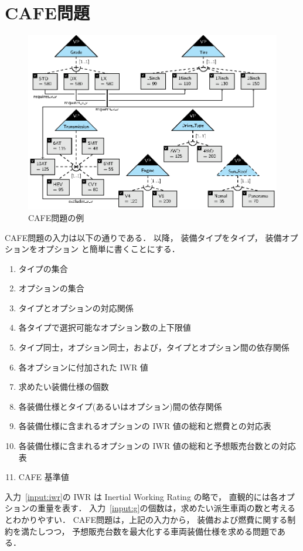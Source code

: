 \section{CAFE問題}\label{sec:background}

\begin{figure}[t]
  \centering
  \includegraphics[width=0.8\linewidth]{images/ovm_example.eps}
  \caption{CAFE問題の例}
  \label{fig:ovm_example}
\end{figure}

CAFE問題の入力は以下の通りである．
以降，
装備タイプをタイプ，
装備オプションをオプション
と簡単に書くことにする．
\begin{enumerate}
\item タイプの集合\label{input:vp}
\item オプションの集合\label{input:v}
\item タイプとオプションの対応関係\label{input:vp-v}
\item 各タイプで選択可能なオプション数の上下限値\label{input:ublb}
\item タイプ同士，オプション同士，および，タイプとオプション間の依存関係
  \label{input:dependency}
\item 各オプションに付加された IWR 値\label{input:iwr}
\item 求めたい装備仕様の個数\label{input:g}
\item 各装備仕様とタイプ(あるいはオプション)間の依存関係\label{input:init}
\item 各装備仕様に含まれるオプションの IWR 値の総和と燃費との対応表\label{input:fe}
\item 各装備仕様に含まれるオプションの IWR 値の総和と予想販売台数との対応表\label{input:sv}
\item CAFE 基準値\label{input:cafe}
\end{enumerate}
入力~\ref{input:iwr}の IWR は Inertial Working Rating の略で，
直観的には各オプションの重量を表す．
入力~\ref{input:g}の個数は，求めたい派生車両の数と考えるとわかりやすい．
CAFE問題は，上記の入力から，
装備および燃費に関する制約を満たしつつ，
予想販売台数を最大化する車両装備仕様を求める問題である．

